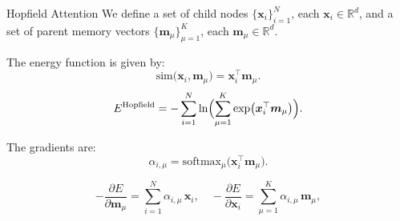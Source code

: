 \documentclass{beamer}
\begin{document}
    
    
    

    
    

\begin{frame}{Hopfield Attention}
    We define a set of child nodes \(\{\bm{x}_i\}_{i=1}^N\), each \(\bm{x}_i \in \mathbb{R}^d\), and a set of parent memory vectors \(\{\bm{m}_\mu\}_{\mu=1}^K\), each \(\bm{m}_\mu \in \mathbb{R}^d\).

    \bigskip

    The energy function is given by:
    \[
    \mathrm{sim}\bigl(\bm{x}_i, \bm{m}_\mu\bigr)
    =
    \bm{x}_i^\top \bm{m}_\mu.
    \]
    \[
    E^{\mathrm{Hopfield}}
    =
    -\sum_{i=1}^N
    \ln \Bigl(\sum_{\mu=1}^K \exp\bigl(\bm{x}_i^\top \bm{m}_\mu\bigr)\Bigr).
    \]

    The gradients are:
    \[
        \alpha_{i,\mu} = \mathrm{softmax}_\mu\!\bigl(\bm{x}_i^\top \bm{m}_\mu\bigr).
    \]
    
    \[
    -\frac{\partial E}{\partial \bm{m}_\mu}
    =
    \sum_{i=1}^N \alpha_{i,\mu}\,\bm{x}_i,
    \quad
    -\frac{\partial E}{\partial \bm{x}_i}
    =
    \sum_{\mu=1}^K \alpha_{i,\mu}\,\bm{m}_\mu,
    \]

\end{frame}
\end{document}
